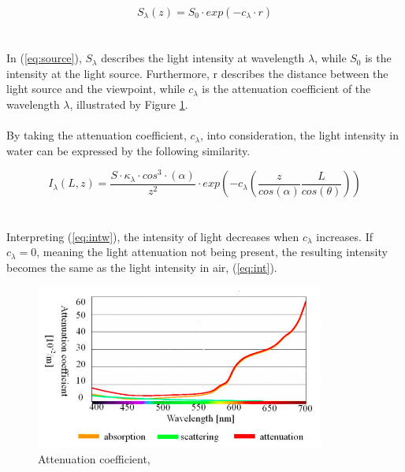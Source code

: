 \begin{equation} \label{eq:source}
S_{\lambda} (z) = S_0 \cdot exp (-c_{\lambda} \cdot r)
\end{equation}
\\\\
In (\ref{eq:source}), $S_{\lambda}$ describes the light intensity at wavelength $\lambda$, while $S_0$ is the intensity at the light source. Furthermore, r describes the distance between the light source and the viewpoint, while $c_{\lambda}$ is the attenuation coefficient of the wavelength $\lambda$, illustrated by Figure \ref{fig:attcoeff}.
\\\\
By taking the attenuation coefficient, $c_{\lambda}$, into consideration, the light intensity in water can be expressed by the following similarity. 

\begin{equation} \label{eq:intw}
    I_ {\lambda} (L, z) = \frac{S \cdot \kappa_{\lambda}\cdot cos^{3}\cdot (\alpha)}{z^2} \cdot exp \left(-c_{\lambda}\left(\frac{z}{cos(\alpha)}\frac{L}{cos(\theta)}\right)\right)
\end{equation}
\\\\
Interpreting (\ref{eq:intw}), the intensity of light decreases when $c_{\lambda}$ increases. If $c_{\lambda} = 0$, meaning the light attenuation not being present, the resulting intensity becomes the same as the light intensity in air, (\ref{eq:int}). 

\begin{figure}[H]
\centering
  \includegraphics[width=9.5cm]{Images/theory/attcoeff.png}
  \caption[Attenuation Coefficient]{Attenuation coefficient, \cite{yamashita_fujii_kaneko_2007}}
  \label{fig:attcoeff}
\end{figure}




